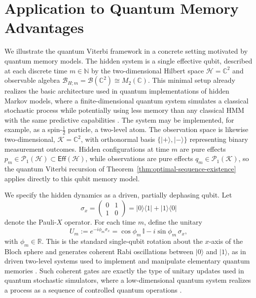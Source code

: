 \documentclass[12pt, reco]{article}
\begin{document}
\section{Application to Quantum Memory Advantages}\label{sect_App}
\label{sec:spin-ensemble}
We illustrate the quantum Viterbi framework in a concrete setting motivated by quantum memory models. The hidden system is a single effective qubit, described at each discrete time \(m \in \mathbb{N}\) by the two-dimensional Hilbert space \(\mathcal{H} = \mathbb{C}^2\) and observable algebra \(\mathcal{B}_{H;m} = \mathcal{B}(\mathbb{C}^2) \cong M_2(\mathbb{C})\).  This minimal setup already realizes the basic architecture used in quantum implementations of hidden Markov models, where a finite-dimensional quantum system simulates a classical stochastic process while potentially using less memory than any classical HMM with the same predictive capabilities \cite{Elliot21}. The system may be implemented, for example, as a spin-\(\tfrac{1}{2}\) particle, a two-level atom. The observation space is likewise two-dimensional, \(\mathcal{K} = \mathbb{C}^2\), with orthonormal basis \(\{|+\rangle,|-\rangle\}\) representing binary measurement outcomes. Hidden configurations at time \(m\) are pure effects \(p_m \in \mathcal{P}_1(\mathcal{H}) \subset \mathsf{Eff}(\mathcal{H})\), while observations are pure effects \(q_m \in \mathcal{P}_1(\mathcal{K})\), so the quantum Viterbi recursion of Theorem~\ref{thm:optimal-sequence-existence} applies directly to this qubit memory model.

We specify the hidden dynamics as a driven, partially dephasing qubit. Let
\[
\sigma_x
=
\begin{pmatrix}
0 & 1\\
1 & 0
\end{pmatrix}
=
|0\rangle\langle 1| + |1\rangle\langle 0|
\]
denote the Pauli-\(X\) operator. For each time \(m\), define the unitary
\[
U_m := e^{-i\phi_m\sigma_x}
  = \cos\phi_m \, \mathbb{I} - i \sin\phi_m \, \sigma_x,
\]
with \(\phi_m \in \mathbb{R}\). This is the standard single-qubit rotation about the \(x\)-axis of the Bloch sphere and generates coherent Rabi oscillations between \(|0\rangle\) and \(|1\rangle\), as in driven two-level systems used to implement and manipulate elementary quantum memories \cite{Nielsen2000}. Such coherent gates are exactly the type of unitary updates used in quantum stochastic simulators, where a low-dimensional quantum system realizes a process as a sequence of controlled quantum operations \cite{ElliotiGu24}.
\end{document}
